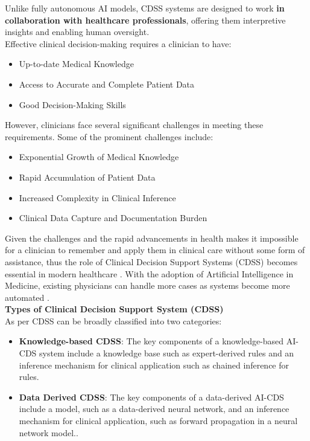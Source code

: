 \noindent Unlike fully autonomous AI models, CDSS systems are designed to work \textcolor{TUMRed}{\textbf{in collaboration with healthcare professionals}}, offering them interpretive insights and enabling human oversight.\\[\baselineskip]

\noindent Effective clinical decision-making requires a clinician to have:
\begin{itemize}
    \item Up-to-date Medical Knowledge
    \item Access to Accurate and Complete Patient Data
    \item Good Decision-Making Skills
\end{itemize}
\noindent However, clinicians face several significant challenges in meeting these requirements. Some of the prominent challenges include:
\begin{itemize}
    \item Exponential Growth of Medical Knowledge
    \item Rapid Accumulation of Patient Data
    \item Increased Complexity in Clinical Inference
    \item Clinical Data Capture and Documentation Burden
\end{itemize}

\noindent Given the challenges and the rapid advancements in health makes it impossible for a clinician to remember and apply them in clinical care without some form of assistance, thus the role of Clinical Decision Support Systems (CDSS) becomes essential in modern healthcare \cite{visweswaran2022integration}. With the adoption of Artificial Intelligence in Medicine, existing physicians can handle more cases as systems become more automated \cite{panch2018artificial}.\\[\baselineskip]

\noindent \textcolor{TUMBlue}{\textbf{Types of Clinical Decision Support System (CDSS)}}\\
As per \cite{visweswaran2022integration} CDSS can be broadly classified into two categories:
\begin{itemize}
    \item \textcolor{TUMRed}{\textbf{Knowledge-based CDSS}}: The key components of a knowledge-based AI-CDS system include a knowledge base such as expert-derived rules and an inference mechanism for clinical application such as chained inference for rules.
    \item \textcolor{TUMRed}{\textbf{Data Derived CDSS}}: The key components of a data-derived AI-CDS include a model, such as a data-derived neural network, and an inference mechanism for clinical application, such as forward propagation in a neural network model..
\end{itemize}

